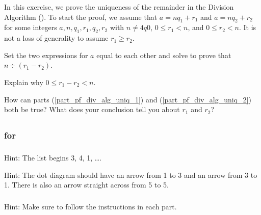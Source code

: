 \begin{exer}[\exerE] %
\label{exer_div_alg_prove_uniqueness}  
    In this exercise, we prove the uniqueness of the remainder in the Division Algorithm (). To start the proof, we assume that $a = nq_1+r_1$ and $a = nq_2 + r_2$ for some integers $a,n,q_1,r_1,q_2,r_2$ with $n \ne4q 0$, $0 \le r_1 < n$, and $0 \le r_2<n$.  It is not a loss of generality to assume $r_1 \ge r_2$.  
        \begin{exerpart}
            \item \label{part_pf_div_alg_uniq_1} Set the two expressions for $a$ equal to each other and solve to prove that $n \div (r_1-r_2)$.
            \item \label{part_pf_div_alg_uniq_2} Explain why $0 \le r_1-r_2 < n$.
            \item How can parts (\ref{part_pf_div_alg_uniq_1}) and (\ref{part_pf_div_alg_uniq_2}) both be true?  What does your conclusion tell you about $r_1$ and $r_2$?
        \end{exerpart}
\end{exer}

\subsection{\answers}

\subsubsection{\answers for  \subperms}

\subsubsection*{ \answers}
\begin{apart}
    \item Hint: The list begins 3, 4, 1, \ldots.
    \item Hint: The dot diagram should have an arrow from 1 to 3 and an arrow from 3 to 1.  There is also an arrow straight across from 5 to 5.
\end{apart}

\subsubsection*{ \answers}
Hint: Make sure to follow the instructions in each part.

